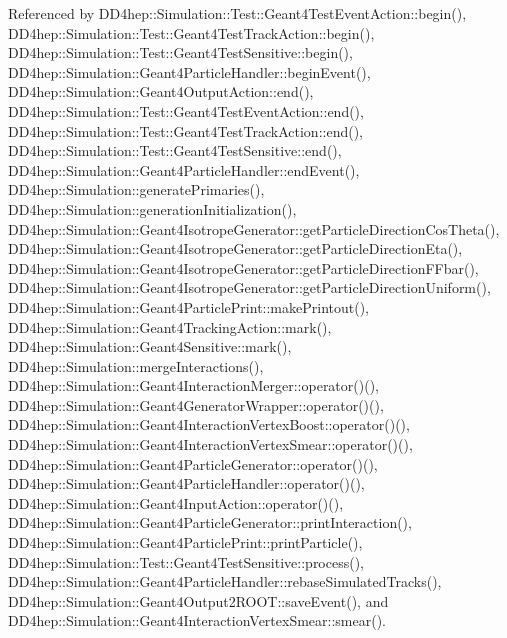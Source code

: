 Referenced by D\+D4hep\+::\+Simulation\+::\+Test\+::\+Geant4\+Test\+Event\+Action\+::begin(), D\+D4hep\+::\+Simulation\+::\+Test\+::\+Geant4\+Test\+Track\+Action\+::begin(), D\+D4hep\+::\+Simulation\+::\+Test\+::\+Geant4\+Test\+Sensitive\+::begin(), D\+D4hep\+::\+Simulation\+::\+Geant4\+Particle\+Handler\+::begin\+Event(), D\+D4hep\+::\+Simulation\+::\+Geant4\+Output\+Action\+::end(), D\+D4hep\+::\+Simulation\+::\+Test\+::\+Geant4\+Test\+Event\+Action\+::end(), D\+D4hep\+::\+Simulation\+::\+Test\+::\+Geant4\+Test\+Track\+Action\+::end(), D\+D4hep\+::\+Simulation\+::\+Test\+::\+Geant4\+Test\+Sensitive\+::end(), D\+D4hep\+::\+Simulation\+::\+Geant4\+Particle\+Handler\+::end\+Event(), D\+D4hep\+::\+Simulation\+::generate\+Primaries(), D\+D4hep\+::\+Simulation\+::generation\+Initialization(), D\+D4hep\+::\+Simulation\+::\+Geant4\+Isotrope\+Generator\+::get\+Particle\+Direction\+Cos\+Theta(), D\+D4hep\+::\+Simulation\+::\+Geant4\+Isotrope\+Generator\+::get\+Particle\+Direction\+Eta(), D\+D4hep\+::\+Simulation\+::\+Geant4\+Isotrope\+Generator\+::get\+Particle\+Direction\+F\+Fbar(), D\+D4hep\+::\+Simulation\+::\+Geant4\+Isotrope\+Generator\+::get\+Particle\+Direction\+Uniform(), D\+D4hep\+::\+Simulation\+::\+Geant4\+Particle\+Print\+::make\+Printout(), D\+D4hep\+::\+Simulation\+::\+Geant4\+Tracking\+Action\+::mark(), D\+D4hep\+::\+Simulation\+::\+Geant4\+Sensitive\+::mark(), D\+D4hep\+::\+Simulation\+::merge\+Interactions(), D\+D4hep\+::\+Simulation\+::\+Geant4\+Interaction\+Merger\+::operator()(), D\+D4hep\+::\+Simulation\+::\+Geant4\+Generator\+Wrapper\+::operator()(), D\+D4hep\+::\+Simulation\+::\+Geant4\+Interaction\+Vertex\+Boost\+::operator()(), D\+D4hep\+::\+Simulation\+::\+Geant4\+Interaction\+Vertex\+Smear\+::operator()(), D\+D4hep\+::\+Simulation\+::\+Geant4\+Particle\+Generator\+::operator()(), D\+D4hep\+::\+Simulation\+::\+Geant4\+Particle\+Handler\+::operator()(), D\+D4hep\+::\+Simulation\+::\+Geant4\+Input\+Action\+::operator()(), D\+D4hep\+::\+Simulation\+::\+Geant4\+Particle\+Generator\+::print\+Interaction(), D\+D4hep\+::\+Simulation\+::\+Geant4\+Particle\+Print\+::print\+Particle(), D\+D4hep\+::\+Simulation\+::\+Test\+::\+Geant4\+Test\+Sensitive\+::process(), D\+D4hep\+::\+Simulation\+::\+Geant4\+Particle\+Handler\+::rebase\+Simulated\+Tracks(), D\+D4hep\+::\+Simulation\+::\+Geant4\+Output2\+R\+O\+O\+T\+::save\+Event(), and D\+D4hep\+::\+Simulation\+::\+Geant4\+Interaction\+Vertex\+Smear\+::smear().

\hypertarget{class_d_d4hep_1_1_simulation_1_1_geant4_context_a49bd243808a839dd79651786db634a9f}{}\label{class_d_d4hep_1_1_simulation_1_1_geant4_context_a49bd243808a839dd79651786db634a9f} 

